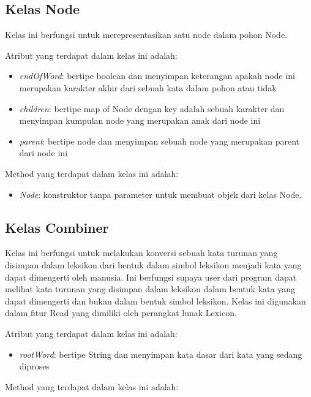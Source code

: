 \subsection{Kelas Node}
\label{sec:kelasNode}

Kelas ini berfungsi untuk merepresentasikan satu node dalam pohon Node.

Atribut yang terdapat dalam kelas ini adalah:

\begin{itemize}
	\item \textit{endOfWord}: bertipe boolean dan menyimpan keterangan apakah node ini merupakan karakter akhir dari sebuah kata dalam pohon atau tidak
	\item \textit{children}: bertipe map of Node dengan key adalah sebuah karakter dan menyimpan kumpulan node yang merupakan anak dari node ini
	\item \textit{parent}: bertipe node dan menyimpan sebuah node yang merupakan parent dari node ini
\end{itemize}

Method yang terdapat dalam kelas ini adalah:

\begin{itemize}
	\item \textit{Node}: konstruktor tanpa parameter untuk membuat objek dari kelas Node.
\end{itemize}

\subsection{Kelas Combiner}
\label{sec:kelasCombiner}

Kelas ini berfungsi untuk melakukan konversi sebuah kata turunan yang disimpan dalam leksikon dari bentuk dalam simbol leksikon menjadi kata yang dapat dimengerti oleh manusia. Ini berfungsi supaya user dari program dapat melihat kata turunan yang disimpan dalam leksikon dalam bentuk kata yang dapat dimengerti dan bukan dalam bentuk simbol leksikon. Kelas ini digunakan dalam fitur Read yang dimiliki oleh perangkat lunak Lexicon.

Atribut yang terdapat dalam kelas ini adalah:

\begin{itemize}
	\item \textit{rootWord}: bertipe String dan menyimpan kata dasar dari kata yang sedang diproses
\end{itemize}

Method yang terdapat dalam kelas ini adalah:

